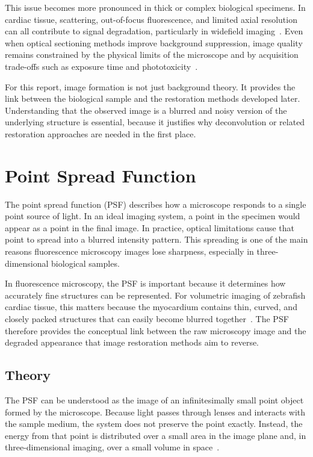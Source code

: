 This issue becomes more pronounced in thick or complex biological specimens. In cardiac tissue, scattering, out-of-focus fluorescence, and limited axial resolution can all contribute to signal degradation, particularly in widefield imaging~\cite{...}. Even when optical sectioning methods improve background suppression, image quality remains constrained by the physical limits of the microscope and by acquisition trade-offs such as exposure time and phototoxicity~\cite{...}.

For this report, image formation is not just background theory. It provides the link between the biological sample and the restoration methods developed later. Understanding that the observed image is a blurred and noisy version of the underlying structure is essential, because it justifies why deconvolution or related restoration approaches are needed in the first place.
\section{Point Spread Function}

The point spread function (PSF) describes how a microscope responds to a single point source of light. In an ideal imaging system, a point in the specimen would appear as a point in the final image. In practice, optical limitations cause that point to spread into a blurred intensity pattern. This spreading is one of the main reasons fluorescence microscopy images lose sharpness, especially in three-dimensional biological samples.

In fluorescence microscopy, the PSF is important because it determines how accurately fine structures can be represented. For volumetric imaging of zebrafish cardiac tissue, this matters because the myocardium contains thin, curved, and closely packed structures that can easily become blurred together~\cite{...}. The PSF therefore provides the conceptual link between the raw microscopy image and the degraded appearance that image restoration methods aim to reverse.

\subsection{Theory}

The PSF can be understood as the image of an infinitesimally small point object formed by the microscope. Because light passes through lenses and interacts with the sample medium, the system does not preserve the point exactly. Instead, the energy from that point is distributed over a small area in the image plane and, in three-dimensional imaging, over a small volume in space~\cite{...}.

